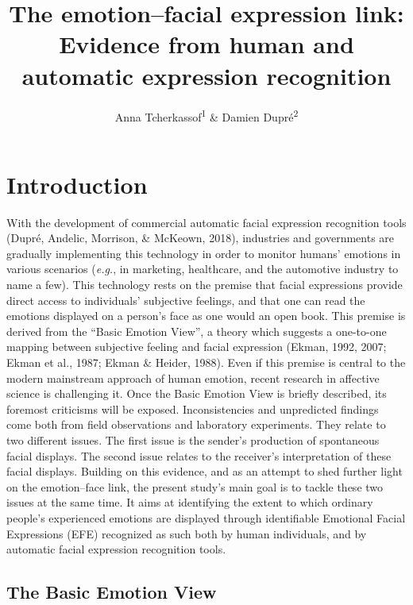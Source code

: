 \documentclass[
  english,
  doc]{apa7}
\title{The emotion--facial expression link: Evidence from human and automatic expression recognition}
\author{Anna Tcherkassof\textsuperscript{1} \& Damien Dupré\textsuperscript{2}}
\date{}
\affiliation{\vspace{0.5cm}\textsuperscript{1} University Grenoble Alpes, Grenoble, France\\\textsuperscript{2} Dublin City University, Dublin, Ireland}
\begin{document}
\maketitle







\hypertarget{introduction}{%
\section{Introduction}\label{introduction}}

With the development of commercial automatic facial expression recognition tools (Dupré, Andelic, Morrison, \& McKeown, 2018), industries and governments are gradually implementing this technology in order to monitor humans' emotions in various scenarios (\emph{e.g.}, in marketing, healthcare, and the automotive industry to name a few). This technology rests on the premise that facial expressions provide direct access to individuals' subjective feelings, and that one can read the emotions displayed on a person's face as one would an open book. This premise is derived from the ``Basic Emotion View'', a theory which suggests a one-to-one mapping between subjective feeling and facial expression (Ekman, 1992, 2007; Ekman et al., 1987; Ekman \& Heider, 1988). Even if this premise is central to the modern mainstream approach of human emotion, recent research in affective science is challenging it. Once the Basic Emotion View is briefly described, its foremost criticisms will be exposed. Inconsistencies and unpredicted findings come both from field observations and laboratory experiments. They relate to two different issues. The first issue is the sender's production of spontaneous facial displays. The second issue relates to the receiver's interpretation of these facial displays. Building on this evidence, and as an attempt to shed further light on the emotion--face link, the present study's main goal is to tackle these two issues at the same time. It aims at identifying the extent to which ordinary people's experienced emotions are displayed through identifiable Emotional Facial Expressions (EFE) recognized as such both by human individuals, and by automatic facial expression recognition tools.

\hypertarget{the-basic-emotion-view}{%
\subsection{The Basic Emotion View}\label{the-basic-emotion-view}}
\end{document}
